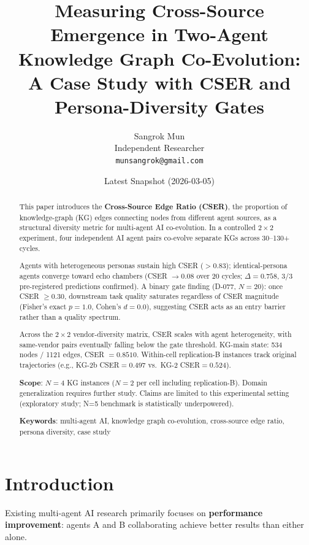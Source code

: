 \documentclass[12pt]{article}
\title{Measuring Cross-Source Emergence in Two-Agent Knowledge Graph Co-Evolution:\\
A Case Study with CSER and Persona-Diversity Gates}
\author{
  Sangrok Mun\\[4pt]
  Independent Researcher\\[2pt]
  \texttt{munsangrok@gmail.com}
}
\date{Latest Snapshot (2026-03-05)}
\begin{document}
\maketitle

\begin{abstract}
This paper introduces the \textbf{Cross-Source Edge Ratio (CSER)}, the proportion of
knowledge-graph (KG) edges connecting nodes from different agent sources, as a
structural diversity metric for multi-agent AI co-evolution.
In a controlled $2\times2$ experiment, four independent AI agent pairs co-evolve
separate KGs across 30--130+ cycles.

Agents with heterogeneous personas sustain high CSER ($>0.83$); identical-persona
agents converge toward echo chambers (CSER $\to 0.08$ over 20 cycles;
$\Delta = 0.758$, 3/3 pre-registered predictions confirmed).
A binary gate finding (D-077, $N=20$): once CSER $\geq 0.30$, downstream task quality
saturates regardless of CSER magnitude (Fisher's exact $p=1.0$, Cohen's $d=0.0$),
suggesting CSER acts as an entry barrier rather than a quality spectrum.

Across the $2\times2$ vendor-diversity matrix, CSER scales with agent heterogeneity,
with same-vendor pairs eventually falling below the gate threshold.
KG-main state: 534 nodes / 1121 edges, CSER $= 0.8510$.
Within-cell replication-B instances track original trajectories
(e.g., KG-2b CSER$=0.497$ vs.\ KG-2 CSER$=0.524$).

\medskip\noindent\textbf{Scope}: $N=4$ KG instances ($N=2$ per cell including
replication-B). Domain generalization requires further study.
Claims are limited to this experimental setting (exploratory study; N=5 benchmark is statistically underpowered).

\medskip\noindent\textbf{Keywords}: multi-agent AI, knowledge graph co-evolution,
cross-source edge ratio, persona diversity, case study
\end{abstract}

\tableofcontents
\newpage

\section{Introduction}

Existing multi-agent AI research primarily focuses on \textbf{performance improvement}:
agents A and B collaborating achieve better results than either alone.
\end{document}
